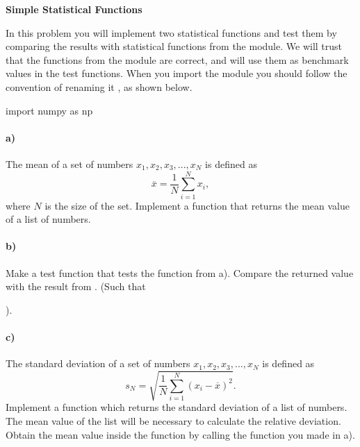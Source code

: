 \begin{Problem}{\textbf{Simple Statistical Functions}}

\noindent In this problem you will implement two statistical functions and test them by comparing the results with statistical functions from the   module. We will trust that the functions from the  module are correct, and will use them as benchmark values in the test functions. When you import the  module you should follow the convention of renaming it , as shown below.
\begin{python}
import numpy as np
\end{python}

\paragraph{a)} 
The mean of a set of numbers ${x_1, x_2, x_3, ..., x_N}$ is defined as
\begin{equation*}
    \overline{x} = \frac{1}{N} \sum_{i=1}^{N} x_i ,
\end{equation*}
where $N$ is the size of the set. 
Implement a function   that returns the mean value of a list of numbers.

\paragraph{b)} Make a test function  that tests the function from a). Compare the returned value with the result from . (Such that  

\noindent
{}).


\paragraph{c)} The standard deviation of a set of numbers ${x_1, x_2, x_3, ..., x_N}$ is defined as
\begin{equation*}
    s_N = \sqrt{ \frac{1}{N} 
        \sum_{i=1}^{N} \left(x_i - \overline{x} \right)^2} .
\end{equation*}
Implement a function  which returns the standard deviation of a list of numbers. The mean value of the list will be necessary to calculate the relative deviation. Obtain the mean value inside the   function by calling the function you made in a).


\end{Problem}
